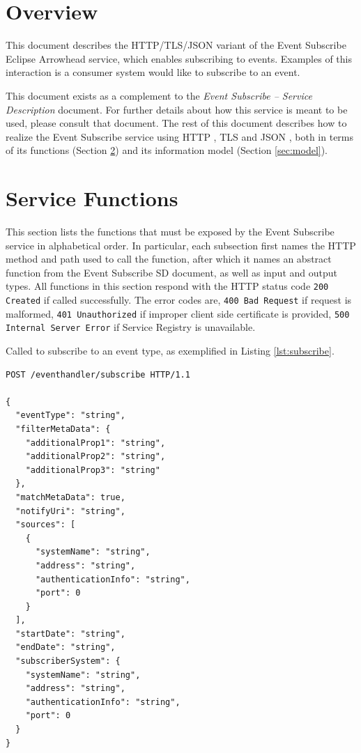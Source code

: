 \documentclass[a4paper]{arrowhead}
\newcommand{\fref}[1]{{\textcolor{ArrowheadBlue}{\hyperref[sec:functions:#1]{#1}}}}
\begin{document}
\section{Overview}
\label{sec:overview}

This document describes the HTTP/TLS/JSON variant of the Event Subscribe Eclipse Arrowhead service, which enables subscribing to events.
Examples of this interaction is a consumer system would like to subscribe to an event.

This document exists as a complement to the \textit{Event Subscribe -- Service Description} document.
For further details about how this service is meant to be used, please consult that document.
The rest of this document describes how to realize the Event Subscribe service using HTTP \cite{fielding2014hypertext}, TLS \cite{rescorla2018transport} and JSON \cite{bray2014json}, both in terms of its functions (Section \ref{sec:functions}) and its information model (Section \ref{sec:model}).

\newpage

\section{Service Functions}
\label{sec:functions}

This section lists the functions that must be exposed by the Event Subscribe service in alphabetical order.
In particular, each subsection first names the HTTP method and path used to call the function, after which it names an abstract function from the Event Subscribe SD document, as well as input and output types.
All functions in this section respond with the HTTP status code \texttt{200 Created} if called successfully. The error codes are, \texttt{400 Bad Request} if request is malformed, \texttt{401 Unauthorized} if improper client side certificate is provided, \texttt{500 Internal Server Error} if Service Registry is unavailable.


Called to subscribe to an event type, as exemplified in Listing \ref{lst:subscribe}.

\begin{lstlisting}[language=http,label={lst:subscribe},caption={An \fref{Event Subscribe} invocation.}]
POST /eventhandler/subscribe HTTP/1.1

{
  "eventType": "string",
  "filterMetaData": {
    "additionalProp1": "string",
    "additionalProp2": "string",
    "additionalProp3": "string"
  },
  "matchMetaData": true,
  "notifyUri": "string",
  "sources": [
    {
      "systemName": "string",
      "address": "string",
      "authenticationInfo": "string",
      "port": 0
    }
  ],
  "startDate": "string",
  "endDate": "string",
  "subscriberSystem": {
    "systemName": "string",
    "address": "string",
    "authenticationInfo": "string",
    "port": 0
  }
}

\end{lstlisting}
\newpage
\end{document}
